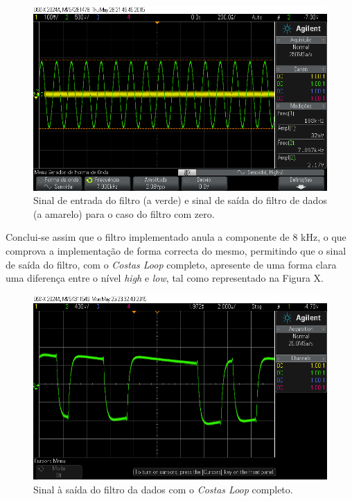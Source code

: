 \documentclass[11pt]{article}
\numberwithin{equation}{section}
\begin{document}
\begin{figure}[H]
	\centering
	\includegraphics[keepaspectratio=true, scale=0.37]{exps/FiltroComZero8k}
	\caption{Sinal de entrada do filtro (a verde) e sinal de saída do filtro de dados (a amarelo) para o caso do filtro com zero.}
	\vspace{-0.8em}
\end{figure} 

Conclui-se assim que o filtro implementado anula a componente de 8 kHz, o que comprova a implementação de forma correcta do mesmo, permitindo que o sinal de saída do filtro, com o \textit{Costas Loop} completo, apresente de uma forma clara uma diferença entre o nível \textit{high} e \textit{low}, tal como representado na Figura X.

\begin{figure}[H]
	\centering
	\includegraphics[keepaspectratio=true, scale=0.37]{exps/pulse_saida_filtro_Sine_mudancanoFiltro}
	\caption{Sinal à saída do filtro da dados com o \textit{Costas Loop} completo.}
	\vspace{-0.8em}
\end{figure}
\end{document}
